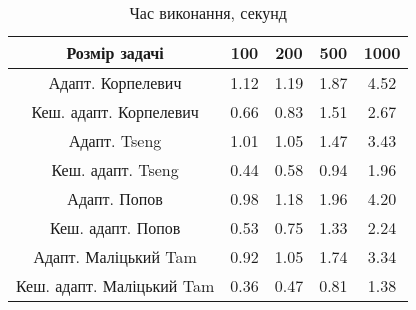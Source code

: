 \begin{table}[H]
	\centering
	\begin{tabular}{|c||c|c|c|c|}\hline
		Розмір задачі & 100 & 200 & 500 & 1000 \\ \hline \hline
		Адапт. Корпелевич & 1.12 & 1.19 & 1.87 & 4.52 \\ \hline
		Кеш. адапт. Корпелевич & 0.66 & 0.83 & 1.51 & 2.67 \\ \hline
		Адапт. Tseng & 1.01 & 1.05 & 1.47 & 3.43 \\ \hline
		Кеш. адапт. Tseng & 0.44 & 0.58 & 0.94 & 1.96 \\ \hline
		Адапт. Попов & 0.98 & 1.18 & 1.96 & 4.20 \\ \hline
		Кеш. адапт. Попов & 0.53 & 0.75 & 1.33 & 2.24 \\ \hline
		Адапт. Маліцький Tam & 0.92 & 1.05 & 1.74 & 3.34 \\ \hline
		Кеш. адапт. Маліцький Tam & 0.36 & 0.47 & 0.81 & 1.38 \\ \hline
	\end{tabular}
	\caption{Час виконання, секунд}
\end{table}

